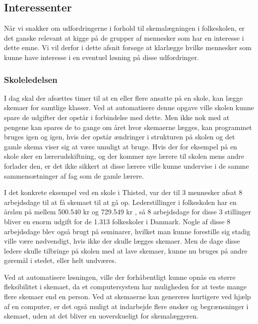 \subsection{Interessenter}
Når vi snakker om udfordringerne i forhold til skemalægningen i folkeskolen, er det ganske relevant at kigge på de grupper af mennesker som har en interesse i dette emne. Vi vil derfor i dette afsnit forsøge at klarlægge hvilke mennesker som kunne have interesse i en eventuel løsning på disse udfordringer.

\subsubsection{Skoleledelsen}

I dag skal der afsættes timer til at en eller flere ansatte på en skole, kan lægge skemaer for samtlige klasser. Ved at automatisere denne opgave ville skolen kunne spare de udgifter der opstår i forbindelse med dette. Men ikke nok med at pengene kan spares de to gange om året hvor skemaerne lægges, kan programmet bruges igen og igen, hvis der opstår ændringer i strukturen på skolen og det gamle skema viser sig at være umuligt at bruge. Hvis der for eksempel på en skole sker en lærerudskiftning, og der kommer nye lærere til skolen mens andre forlader den, er det ikke sikkert at disse lærere ville kunne undervise i de samme sammensætninger af fag som de gamle lærere.

I det konkrete eksempel ved en skole i Thisted, var der til 3 mennesker afsat 8 arbejdsdage til at få skemaet til at gå op. Lederstillinger i folkeskolen har en årsløn på mellem 500.540 kr og 729.549 kr \cite{Statens_adm}\cite{TR_HAANDBOGEN}, så 8 arbejdsdage for disse 3 stillinger bliver en enorm udgift for de 1.313 folkeskoler i Danmark\cite{UVM-Folkeskoler}. Nogle af disse 8 arbejdsdage blev også brugt på seminarer, hvilket man kunne forestille sig stadig ville være nødvendigt, hvis ikke der skulle lægges skemaer. Men de dage disse ledere skulle tilbringe på skolen med at lave skemaer, kunne nu bruges på andre gøremål i stedet, eller helt undværes.

Ved at automatisere løsningen, ville der forhåbentligt kunne opnås en større fleksibilitet i skemaet, da et computersystem har muligheden for at teste mange flere skemaer end en person. Ved at skemaerne kan genereres hurtigere ved hjælp af en computer, er det også muligt at indarbejde flere ønsker og begrænsninger i skemaet, uden at det bliver en uoverskueligt for skemalæggeren. 

